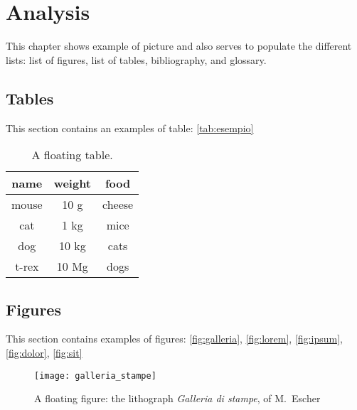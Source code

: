 \chapter{Analysis}
\label{chap:analysis}

\lipsum[1]

\minitoc

\newpage

This chapter shows example of picture and also serves to populate the different lists: list of figures, list of tables, bibliography, and glossary.

\section{Tables}

This section contains an examples of table: \autoref{tab:esempio}

\begin{table}[!ht]
	\centering
	\begin{tabular}{ccc}
		\toprule
		name & weight & food \\ 
		\midrule
		mouse	& 10 g	& cheese \\
		cat	& 1 kg	& mice \\
		dog	& 10 kg	& cats \\
		t-rex	& 10 Mg	& dogs \\
		\bottomrule 
	\end{tabular}
	\caption[A floating table]{A floating table.}
	\label{tab:esempio}
\end{table}

\section{Figures}

This section contains examples of figures: \autoref{fig:galleria}, \autoref{fig:lorem}, \autoref{fig:ipsum}, \autoref{fig:dolor}, \autoref{fig:sit}

\begin{figure}[!ht] 
	\centering 
	\texttt{[image: galleria\_stampe]} 
	\caption[A floating figure]{A floating figure: the lithograph \emph{Galleria di stampe}, of M.~Escher}
	\label{fig:galleria} 
\end{figure}

